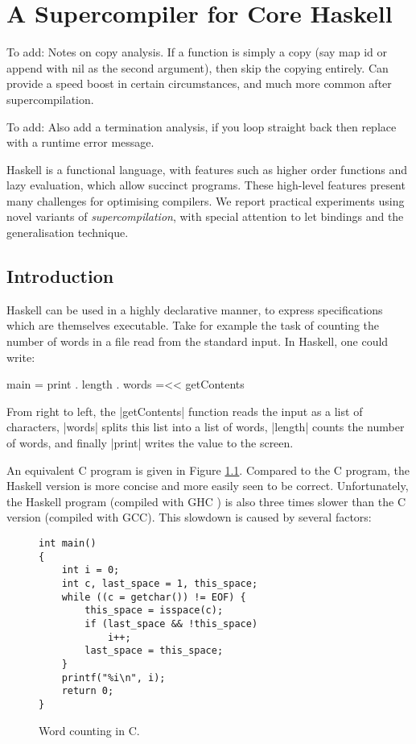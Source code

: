 
\newcommand{\generalise}{\bowtie}

\chapter{A Supercompiler for Core Haskell}

To add: Notes on copy analysis. If a function is simply a copy (say map id or append with nil as the second argument), then skip the copying entirely. Can provide a speed boost in certain circumstances, and much more common after supercompilation.

To add: Also add a termination analysis, if you loop straight back then replace with a runtime error message.

Haskell is a functional language, with features such as higher order functions and lazy evaluation, which allow succinct programs. These high-level features present many challenges for optimising compilers. We report practical experiments using novel variants of \textit{supercompilation}, with special attention to let bindings and the generalisation technique.

\section{Introduction}

Haskell \cite{haskell} can be used in a highly declarative manner, to express specifications which are themselves executable. Take for example the task of counting the number of words in a file read from the standard input. In Haskell, one could write:

\begin{code}
main = print . length . words =<< getContents
\end{code}

From right to left, the |getContents| function reads the input as a list of characters, |words| splits this list into a list of words, |length| counts the number of words, and finally |print| writes the value to the screen.

An equivalent C program is given in Figure \ref{fig:c_words}. Compared to the C program, the Haskell version is more concise and more easily seen to be correct. Unfortunately, the Haskell program (compiled with GHC \cite{ghc}) is also three times slower than the C version (compiled with GCC). This slowdown is caused by several factors:

\begin{figure}
\begin{verbatim}
int main()
{
	int i = 0;
	int c, last_space = 1, this_space;
	while ((c = getchar()) != EOF) {
		this_space = isspace(c);
		if (last_space && !this_space)
			i++;
		last_space = this_space;
	}
	printf("%i\n", i);
	return 0;
}
\end{verbatim}
\caption{Word counting in C.}
\label{fig:c_words}
\end{figure}

